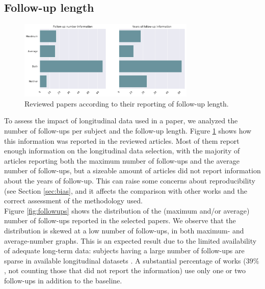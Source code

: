 \subsection{Follow-up length} 
 
 \begin{figure}[!htbp]
\centering
\includegraphics[width=0.75\textwidth]{figures/review/Fig2.pdf}
    \caption{Reviewed papers according to their reporting of follow-up length.}\label{fig:followupsdist}
\end{figure}
 
To assess the impact of longitudinal data used in a paper, we analyzed the number of follow-ups per subject and the follow-up length. Figure \ref{fig:followupsdist} shows how this information was reported in the reviewed articles. Most of them report enough information on the longitudinal data selection, with the majority of articles reporting both the maximum number of follow-ups and the average number of follow-ups, but a sizeable amount of articles did not report information about the years of follow-up. This can raise some concerns about reproducibility (see Section \ref{sec:bias}, and it affects the comparison with other works and the correct assessment of the methodology used. \\

Figure \ref{fig:followups} shows the distribution of the (maximum and/or average) number of follow-ups reported in the selected papers. We observe that the distribution is skewed at a low number of follow-ups, in both maximum- and average-number graphs. This is an expected result due to the limited availability of adequate long-term data: subjects having a large number of follow-ups are sparse in available longitudinal datasets \cite{Lawrence2017}. A substantial percentage of works ($39\%$, not counting those that did not report the information) use only one or two follow-ups in addition to the baseline. \\

